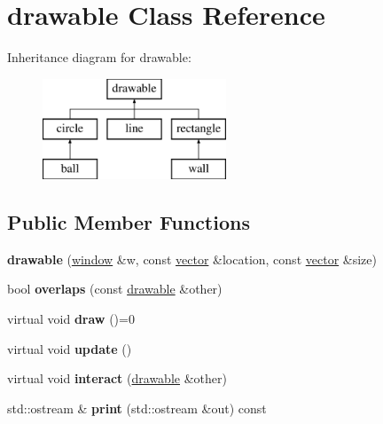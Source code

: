 \hypertarget{classdrawable}{}\section{drawable Class Reference}
\label{classdrawable}
Inheritance diagram for drawable\+:\begin{figure}[H]
\begin{center}
\leavevmode
\includegraphics[height=3.000000cm]{classdrawable}
\end{center}
\end{figure}
\subsection*{Public Member Functions}
\begin{DoxyCompactItemize}
\item 
\mbox{\label{classdrawable_a8fac7702c5f585c2d0deec8fb1fcc202}} 
{\bfseries drawable} (\hyperlink{classwindow}{window} \&w, const \hyperlink{classvector}{vector} \&location, const \hyperlink{classvector}{vector} \&size)
\item 
\mbox{\label{classdrawable_a597f96aa3ae294757d9816c741cfc00a}} 
bool {\bfseries overlaps} (const \hyperlink{classdrawable}{drawable} \&other)
\item 
\mbox{\label{classdrawable_a5462dc7c98484f05fcaa4e30a55e953a}} 
virtual void {\bfseries draw} ()=0
\item 
\mbox{\label{classdrawable_a483266f1539329edc7e9ffa5068cdca7}} 
virtual void {\bfseries update} ()
\item 
\mbox{\label{classdrawable_ac36f995bf614accb3381db74e5f2b030}} 
virtual void {\bfseries interact} (\hyperlink{classdrawable}{drawable} \&other)
\item 
\mbox{\label{classdrawable_a08bfd6356d7ab7bbe40c1e382dfbeda2}} 
std\+::ostream \& {\bfseries print} (std\+::ostream \&out) const
\end{DoxyCompactItemize}
